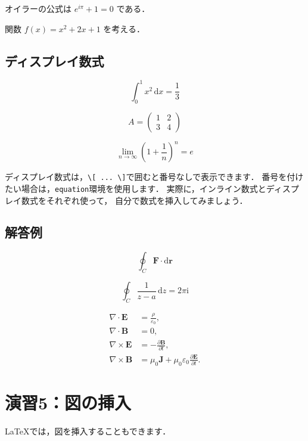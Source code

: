 \documentclass[a4paper,twocolumn]{jsarticle}
\newcommand{\dif}{\mathrm{d}}
\newcommand{\ii}{\mathrm{i}}
\newcommand{\vect}[1]{\bm{#1}}
\begin{document}
オイラーの公式は $e^{i\pi}+1=0$ である．

関数 $f(x)=x^2+2x+1$ を考える．

\subsection*{ディスプレイ数式}
\begin{equation}
\int_{0}^{1} x^2\,\dif x=\frac{1}{3}
\label{eq:integral}
\end{equation}

\begin{equation}
A=
\begin{pmatrix}
1 & 2\\
3 & 4
\end{pmatrix}
\label{eq:matrix}
\end{equation}

\begin{equation}
\lim_{n\to\infty}
\left(1+\frac{1}{n}\right)^n=e
\label{eq:euler}
\end{equation}

ディスプレイ数式は，\verb|\[ ... \]|で囲むと番号なしで表示できます．
番号を付けたい場合は，\verb|equation|環境を使用します．
実際に，インライン数式とディスプレイ数式をそれぞれ使って，
自分で数式を挿入してみましょう．

\subsection*{解答例}
\begin{equation}
\oint_C \vect{F}\cdot \dif\vect{r}
\end{equation}

\begin{equation}
\oint_C \frac{1}{z-a}\,\dif z = 2\pi \ii
\end{equation}

\begin{align}
\nabla \cdot \vect{E} &= \frac{\rho}{\varepsilon_0}, \\
\nabla \cdot \vect{B} &= 0, \\
\nabla \times \vect{E} &= -\frac{\partial \vect{B}}{\partial t}, \\
\nabla \times \vect{B} &= \mu_0 \vect{J}
+ \mu_0 \varepsilon_0 \frac{\partial \vect{E}}{\partial t}.
\end{align}

\section*{演習5：図の挿入}
LaTeXでは，図を挿入することもできます．
\end{document}
